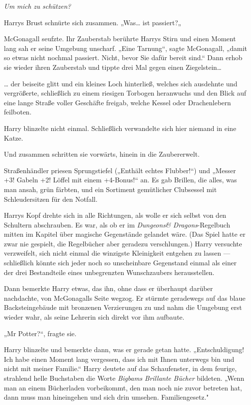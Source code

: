 {\emph{Um mich zu schützen?}

Harrys Brust schnürte sich zusammen. „Was… ist passiert?„

McGonagall seufzte. Ihr Zauberstab berührte Harrys Stirn und einen Moment lang sah er seine Umgebung unscharf. „Eine Tarnung“, sagte McGonagall, „damit so etwas nicht nochmal passiert. Nicht, bevor Sie dafür bereit sind.“ Dann erhob sie wieder ihren Zauberstab und tippte drei Mal gegen einen Ziegelstein…

… der beiseite glitt und ein kleines Loch hinterließ, welches sich ausdehnte und vergrößerte, schließlich zu einem riesigen Torbogen heranwuchs und den Blick auf eine lange Straße voller Geschäfte freigab, welche Kessel oder Drachenlebern feilboten.

Harry blinzelte nicht einmal. Schließlich verwandelte sich hier niemand in eine Katze.

Und zusammen schritten sie vorwärts, hinein in die Zaubererwelt.

Straßenhändler priesen Sprungstiefel („Enthält echtes Flubber!“) und „Messer +3! Gabeln +2! Löffel mit einem +4-Bonus!“ an. Es gab Brillen, die alles, was man ansah, grün färbten, und ein Sortiment gemütlicher Clubsessel mit Schleudersitzen für den Notfall.

Harrys Kopf drehte sich in alle Richtungen, als wolle er sich selbst von den Schultern abschrauben. Es war, als ob er im \emph{Dungeons\& Dragons}-Regelbuch mitten im Kapitel über magische Gegenstände gelandet wäre. (Das Spiel hatte er zwar nie gespielt, die Regelbücher aber geradezu verschlungen.) Harry versuchte verzweifelt, sich nicht einmal die winzigste Kleinigkeit entgehen zu lassen --- schließlich könnte sich jeder noch so unscheinbare Gegenstand einmal als einer der drei Bestandteile eines unbegrenzten Wunschzaubers herausstellen.

Dann bemerkte Harry etwas, das ihn, ohne dass er überhaupt darüber nachdachte, von McGonagalls Seite wegzog. Er stürmte geradewegs auf das blaue Backsteingebäude mit bronzenen Verzierungen zu und nahm die Umgebung erst wieder wahr, als seine Lehrerin sich direkt vor ihm aufbaute.

„Mr Potter?“, fragte sie.

Harry blinzelte und bemerkte dann, was er gerade getan hatte. „Entschuldigung! Ich habe einen Moment lang vergessen, dass ich mit Ihnen unterwegs bin und nicht mit meiner Familie.“ Harry deutete auf das Schaufenster, in dem feurige, strahlend helle Buchstaben die Worte \emph{Bigbams Brillante Bücher} bildeten. „Wenn man an einem Bücherladen vorbeikommt, den man noch nie zuvor betreten hat, dann muss man hineingehen und sich drin umsehen. Familiengesetz."

}
